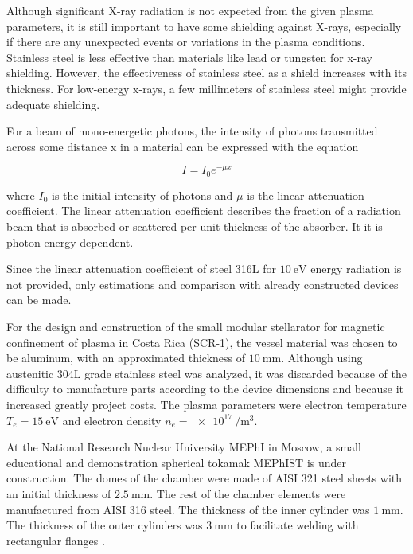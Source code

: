 Although significant X-ray radiation is not expected from the given plasma parameters, it is still important to have some shielding against X-rays, especially if there are any unexpected events or variations in the plasma conditions.
Stainless steel is less effective than materials like lead or tungsten for x-ray shielding.
However, the effectiveness of stainless steel as a shield increases with its thickness.
For low-energy x-rays, a few millimeters of stainless steel might provide adequate shielding.

For a beam of mono-energetic photons, the intensity of photons transmitted across some distance x in a material can be expressed with the equation

\begin{equation}
      I = I_{0} e ^{- \mu x}
\end{equation}

where $I_0$ is the initial intensity of photons and $\mu$ is the linear attenuation coefficient.
The linear attenuation coefficient describes the fraction of a radiation beam that is absorbed or scattered per unit thickness of the absorber.
It it is photon energy dependent\cite{HVL}.

Since the linear attenuation coefficient of steel 316L for $\SI{10}{\electronvolt}$ energy radiation is not provided, only estimations and comparison with already constructed devices can be made.


For the design and construction of the small modular stellarator for magnetic confinement of plasma in Costa Rica (SCR-1), the vessel material was chosen to be aluminum, with an approximated thickness of $\SI{10}{\milli\meter}$. Although using austenitic 304L grade stainless steel was analyzed, it was discarded because of the difficulty to manufacture parts according to the device dimensions and because it increased greatly project costs\cite{SCR}.
The plasma parameters were electron temperature $T_e = \SI{15}{\electronvolt}$ and electron density $n_e = \SI{e17}{\per\cubic\meter}$.

At the National Research Nuclear University MEPhI in Moscow, a small educational and demonstration
spherical tokamak MEPhIST is under construction. The domes of the chamber were made of AISI 321
steel sheets with an initial thickness of $\SI{2.5}{\milli\meter}$. The rest of the chamber elements were manufactured from AISI 316 steel. The thickness of the inner cylinder was $\SI{1}{\milli\meter}$. The thickness of the outer cylinders was $\SI{3}{\milli\meter}$ to facilitate welding with rectangular flanges \cite{MEP}.

